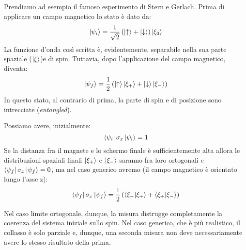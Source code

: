 \begin{esempio}
    
    Prendiamo ad esempio il famoso esperimento di Stern e Gerlach. Prima di applicare un campo magnetico lo stato è dato da:
    \begin{equation*}
        \ket{\psi_i}= \frac{1}{\sqrt 2} \left( \ket{\uparrow} + \ket{\downarrow} \right) \ket{\xi_0}
    \end{equation*}
    La funzione d'onda così scritta è, evidentemente, separabile nella sua parte spaziale ($\ket \xi$)e di spin. Tuttavia, dopo l'applicazione del campo magnetico, diventa:
    \begin{equation*}
        \ket{\psi_f} = \frac{1}{2}\left(\ket \uparrow \ket{\xi_+} +\ket \downarrow \ket{\xi_-} \right)
    \end{equation*}
    In questo stato, al contrario di prima, la parte di spin e di posizione sono intrecciate (\textit{entangled}).
    
    \noindent Possiamo avere, inizialmente:
    \begin{equation*}
        \bra{\psi_i}\sigma_x \ket{\psi_i} = 1
    \end{equation*}
    Se la distanza fra il magnete e lo schermo finale è sufficientemente alta allora le distribuzioni spaziali finali $\ket{\xi_+}$ e $\ket{\xi_-}$ saranno fra loro ortogonali e $\bra{\psi_f}\sigma_x \ket{\psi_f}=0$, ma nel caso generico avremo (il campo magnetico è orientato lungo l'asse z):
    \begin{equation*}
        \bra{\psi_f}\sigma_x \ket{\psi_f}= \frac{1}{2}\left( \braket{\xi_-}{\xi_+}+\braket{\xi_+}{\xi_-} \right)
    \end{equation*}
    
    \noindent Nel caso limite ortogonale, dunque, la misura distrugge completamente la coerenza del sistema iniziale sullo spin. Nel caso generico, che è più realistico, il collasso è solo parziale e, dunque, una seconda misura non deve necessariamente avere lo stesso risultato della prima.
    
\end{esempio}
